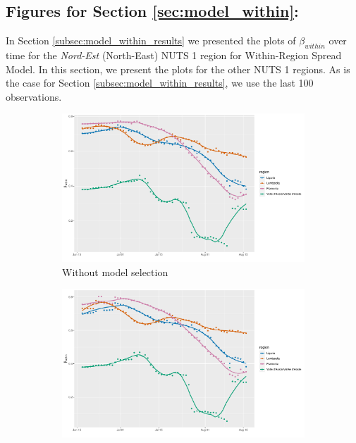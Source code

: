 \documentclass[12pt]{article}
\begin{document}
\begin{appendices}
		\subsection{Figures for Section \ref{sec:model_within}: } \label{sapp:model_within_figures}
		In Section \ref{subsec:model_within_results} we presented the plots of $\beta_{within}$ over time for the \textit{Nord-Est} (North-East) NUTS 1 region for Within-Region Spread Model. In this section, we present the plots for the other NUTS 1 regions. As is the case for Section \ref{subsec:model_within_results}, we use the last 100 observations. \\
		
		\begin{figure}[H]
    	    \centering
    	    \begin{subfigure}{\textwidth}
    	      \centering
    	      \includegraphics[width=0.95\linewidth]{output/model_within_lag14_betawithin_Nord-Ovest_rolling.pdf}
    	      \caption{Without model selection}
    	      \label{fig:beta_within_over_time_northwest_regular}
    	    \end{subfigure}\newline
    	    \begin{subfigure}{\textwidth}
    	      \centering
    	      \includegraphics[width=0.95\linewidth]{output/model_within_lag14_betawithin_Nord-Ovest_aic_rolling.pdf}

\end{subfigure}
\end{figure}
\end{appendices}
\end{document}
